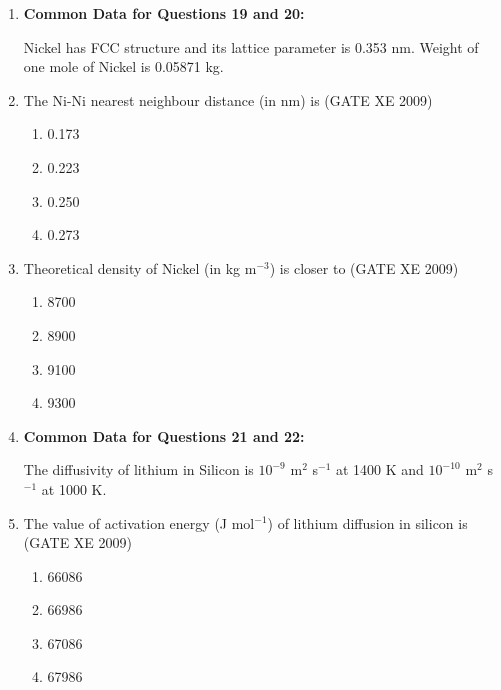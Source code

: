 \documentclass[journal]{IEEEtran}
\begin{document}
\begin{enumerate}
    \item[] \textbf{Common Data for Questions 19 and 20:}

    Nickel has FCC structure and its lattice parameter is 0.353 nm. Weight of one mole of Nickel is 0.05871 kg.

    \item The Ni-Ni nearest neighbour distance (in nm) is \hfill (GATE XE 2009)

    \begin{multicols}{4}
        \begin{enumerate}
            \item 0.173
            \item 0.223
            \item 0.250
            \item 0.273
        \end{enumerate}
    \end{multicols}

    \item Theoretical density of Nickel (in kg m$^{-3}$) is closer to \hfill (GATE XE 2009)

    \begin{multicols}{4}
        \begin{enumerate}
            \item 8700
            \item 8900
            \item 9100
            \item 9300
        \end{enumerate}
    \end{multicols}

    \item[] \textbf{Common Data for Questions 21 and 22:}
    
    The diffusivity of lithium in Silicon is $10^{-9}$ m$^2$ s$^{-1}$ at 1400 K and $10^{-10}$ m$^2$ s$^{-1}$ at 1000 K.
    
    \item The value of activation energy (J mol$^{-1}$) of lithium diffusion in silicon is \hfill (GATE XE 2009)
    \begin{multicols}{4}
        \begin{enumerate}
            \item 66086
            \item 66986
            \item 67086
            \item 67986
        \end{enumerate}
    \end{multicols}


\end{enumerate}
\end{document}

